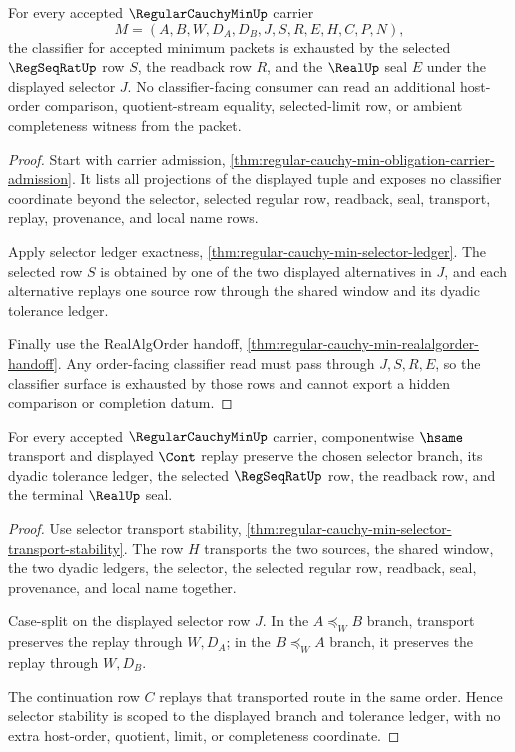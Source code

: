 \begin{theorem}
\label{thm:regular-cauchy-min-obligation-classifier-scope}
For every accepted $\RegularCauchyMinUp$ carrier
$$
M=(A,B,W,D_A,D_B,J,S,R,E,H,C,P,N),
$$
the classifier for accepted minimum packets is exhausted by the selected $\RegSeqRatUp$ row $S$, the readback row $R$, and the $\RealUp$ seal $E$ under the displayed selector $J$. No classifier-facing consumer can read an additional host-order comparison, quotient-stream equality, selected-limit row, or ambient completeness witness from the packet.
\end{theorem}
\begin{proof}
Start with carrier admission, \autoref{thm:regular-cauchy-min-obligation-carrier-admission}. It lists all projections of the displayed tuple and exposes no classifier coordinate beyond the selector, selected regular row, readback, seal, transport, replay, provenance, and local name rows.

Apply selector ledger exactness, \autoref{thm:regular-cauchy-min-selector-ledger}. The selected row $S$ is obtained by one of the two displayed alternatives in $J$, and each alternative replays one source row through the shared window and its dyadic tolerance ledger.

Finally use the RealAlgOrder handoff, \autoref{thm:regular-cauchy-min-realalgorder-handoff}. Any order-facing classifier read must pass through $J,S,R,E$, so the classifier surface is exhausted by those rows and cannot export a hidden comparison or completion datum.
\end{proof}

\begin{theorem}
\label{thm:regular-cauchy-min-selector-stability-scope}
For every accepted $\RegularCauchyMinUp$ carrier, componentwise $\hsame$ transport and displayed $\Cont$ replay preserve the chosen selector branch, its dyadic tolerance ledger, the selected $\RegSeqRatUp$ row, the readback row, and the terminal $\RealUp$ seal.
\end{theorem}
\begin{proof}
Use selector transport stability, \autoref{thm:regular-cauchy-min-selector-transport-stability}. The row $H$ transports the two sources, the shared window, the two dyadic ledgers, the selector, the selected regular row, readback, seal, provenance, and local name together.

Case-split on the displayed selector row $J$. In the $A \preceq_W B$ branch, transport preserves the replay through $W,D_A$; in the $B \preceq_W A$ branch, it preserves the replay through $W,D_B$.

The continuation row $C$ replays that transported route in the same order. Hence selector stability is scoped to the displayed branch and tolerance ledger, with no extra host-order, quotient, limit, or completeness coordinate.
\end{proof}

